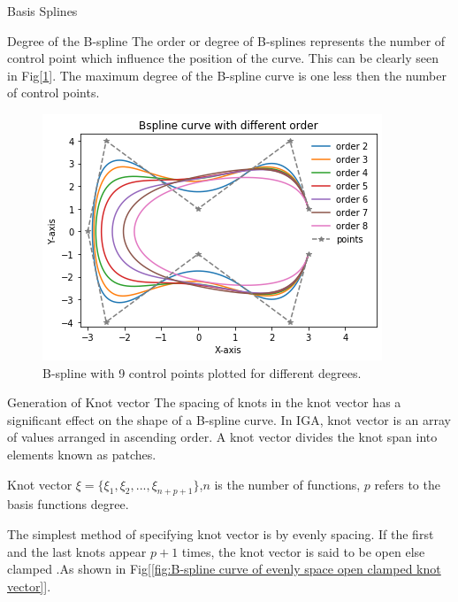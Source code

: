 \documentclass[a4paper,12pt,times]{article}
\begin{document}
\begin{section}{Basis Splines}
\begin{subsection}{Degree of the B-spline}
The order or degree of B-splines represents the number of control point which influence the position of the curve. This can be clearly seen in  Fig[\ref{fig:B-spline for various degrees}]. The maximum degree of the B-spline curve is one less then the number of control points.

\begin{figure}[h!]
\centering
\includegraphics[width=0.9\linewidth]{Bspline_curve_different_order.png}
\caption{B-spline with 9 control points plotted for different degrees.}
\label{fig:B-spline for various degrees}
\end{figure}

\end{subsection}

\begin{subsection}{Generation of Knot vector}
The spacing of knots in the knot vector has a significant effect on the shape of a B-spline curve. In IGA, knot vector is an array of values arranged in ascending order. A knot vector divides the knot span into elements known as patches.


Knot vector ${\displaystyle \xi =\{\xi _{1},\xi _{2},...,\xi _{n+p+1}\}}$,${\displaystyle n}$ is the number of functions, ${\displaystyle p}$ refers to the basis functions degree.

The simplest method of specifying knot vector is by evenly spacing. If the first and the last knots appear ${\displaystyle p+1}$ times, the knot vector is said to be open else clamped .As shown in Fig[\ref{fig:B-spline curve of evenly space open clamped knot vector}].\\



\end{subsection}
\end{section}
\end{document}
